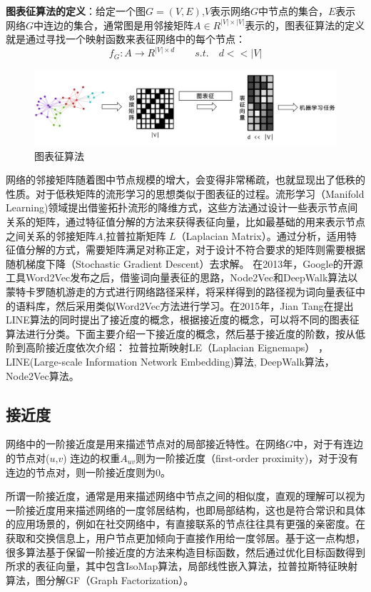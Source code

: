 \textbf{图表征算法的定义}：给定一个图$G = (V,E)$,$V$表示网络$G$中节点的集合，$E$表示网络$G$中连边的集合，通常图是用邻接矩阵$A \in R^{|V|\times|V|}$表示的，图表征算法的定义就是通过寻找一个映射函数来表征网络中的每个节点：
\begin{equation}
f_G: A \rightarrow R^{|V| \times d} \qquad s.t.\quad d<<|V|
\end{equation}

\begin{figure}
	\centering
	\includegraphics[width=5.5in]{figures/network_embedding}
	\caption{图表征算法}
\end{figure}


网络的邻接矩阵随着图中节点规模的增大，会变得非常稀疏，也就显现出了低秩的性质。对于低秩矩阵的流形学习的思想类似于图表征的过程。流形学习（Manifold Learning)领域提出借鉴拓扑流形的降维方式，这些方法通过设计一些表示节点间关系的矩阵，通过特征值分解的方法来获得表征向量，比如最基础的用来表示节点之间关系的邻接矩阵$A$,拉普拉斯矩阵 $L$（Laplacian Matrix）。通过分析，适用特征值分解的方式，需要矩阵满足对称正定，对于设计不符合要求的矩阵则需要根据随机梯度下降（Stochastic Gradient Descent）去求解。
在2013年，Google的开源工具Word2Vec\cite{mikolov2013efficient}发布之后，借鉴词向量表征的思路，Node2Vec和DeepWalk算法以蒙特卡罗随机游走的方式进行网络路径采样，将采样得到的路径视为词向量表征中的语料库，然后采用类似Word2Vec方法进行学习。在2015年，Jian Tang\cite{tang2015line}在提出LINE算法的同时提出了接近度的概念，根据接近度的概念，可以将不同的图表征算法进行分类。下面主要介绍一下接近度的概念，然后基于接近度的阶数，按从低阶到高阶接近度依次介绍：%
拉普拉斯映射LE（Laplacian Eignemaps） ， LINE(Large-scale Information Network Embedding)算法, DeepWalk算法，Node2Vec算法。
\subsection{接近度}
网络中的一阶接近度是用来描述节点对的局部接近特性。在网络$G$中，对于有连边的节点对($u$,$v$)
连边的权重$A_{uv}$则为一阶接近度（first-order proximity)，对于没有连边的节点对，则一阶接近度则为0。

所谓一阶接近度，通常是用来描述网络中节点之间的相似度，直观的理解可以视为一阶接近度用来描述网络的一度邻居结构，也即局部结构，这也是符合常识和具体的应用场景的，例如在社交网络中，有直接联系的节点往往具有更强的亲密度。在获取和交换信息上，用户节点更加倾向于直接作用给一度邻居。基于这一点构想，很多算法基于保留一阶接近度的方法来构造目标函数，然后通过优化目标函数得到所求的表征向量，其中包含IsoMap算法，局部线性嵌入算法，拉普拉斯特征映射算法，图分解GF\cite{ahmed2013distributed}（Graph Factorization）。


